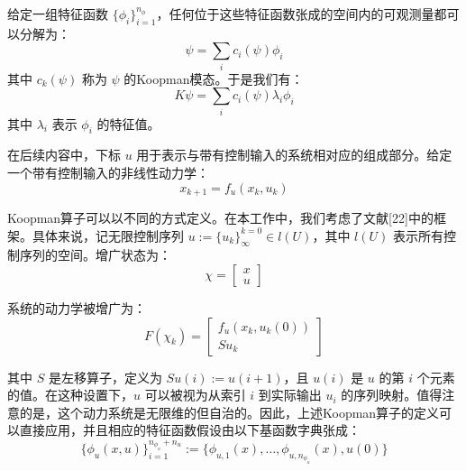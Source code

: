 \documentclass[lang=chs, degree=master, blindreview=false, winfonts=true]{yanputhesis}
\begin{document}
给定一组特征函数 \(\{\phi_i\}_{i=1}^{n_\phi}\)，任何位于这些特征函数张成的空间内的可观测量都可以分解为：
\begin{equation}
	\psi = \sum_i c_i(\psi)\phi_i
\end{equation}
其中 \( c_k(\psi) \) 称为 \( \psi \) 的Koopman模态。于是我们有：
\begin{equation}
	K\psi = \sum_i c_i(\psi)\lambda_i\phi_i
\end{equation}
其中 \( \lambda_i \) 表示 \( \phi_i \) 的特征值。

在后续内容中，下标 \( u \) 用于表示与带有控制输入的系统相对应的组成部分。给定一个带有控制输入的非线性动力学：
\begin{equation}
	x_{k+1} = f_u(x_k, u_k)
\end{equation}

Koopman算子可以以不同的方式定义。在本工作中，我们考虑了文献[22]中的框架。具体来说，记无限控制序列 \( u := \{u_k\}_{\infty}^{k=0} \in l(U) \)，其中 \( l(U) \) 表示所有控制序列的空间。增广状态为：
\begin{equation}
	\chi=\begin{bmatrix}x\\u\end{bmatrix}
\end{equation}

系统的动力学被增广为：
\begin{equation}
	F(\chi_k)=\begin{bmatrix}f_u(x_k,u_k(0))\\Su_k\end{bmatrix}
\end{equation}

其中 \( S \) 是左移算子，定义为 \( Su(i) := u(i + 1) \)，且 \( u(i) \) 是 \( u \) 的第 \( i \) 个元素的值。在这种设置下，\( u \) 可以被视为从索引 \( i \) 到实际输出 \( u_i \) 的序列映射。值得注意的是，这个动力系统是无限维的但自治的。因此，上述Koopman算子的定义可以直接应用，并且相应的特征函数假设由以下基函数字典张成：
\begin{equation}
	\{\phi_u(x, u)\}_{i=1}^{n_{\phi_u} + n_u} := \{\phi_{u,1}(x), \ldots, \phi_{u,n_{\phi_u}}(x), u(0)\}
\end{equation}
\end{document}
